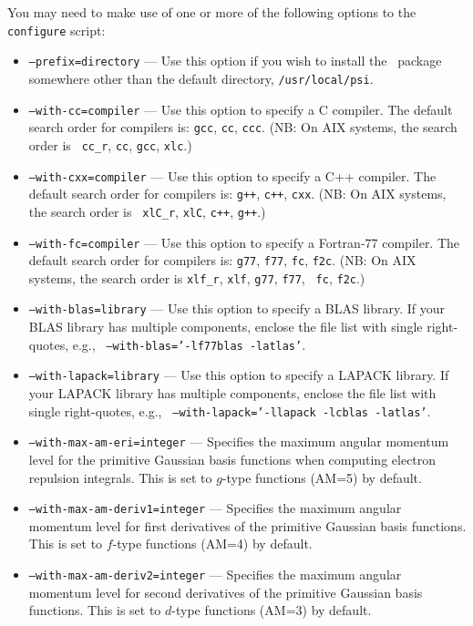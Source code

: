 \documentclass[12pt]{article}
\begin{document}
\noindent
You may need to make use of one or more of the following options to
the {\tt configure} script:
\begin{itemize}
\item {\tt --prefix=directory} --- Use this option if you wish to
  install the \PSIthree\ package somewhere other than the default
  directory, {\tt /usr/local/psi}.
\item {\tt --with-cc=compiler} --- Use this option to specify a C
  compiler.  The default search order for compilers is: {\tt gcc},
  {\tt cc}, {\tt ccc}.  (NB: On AIX systems, the search order is {\tt
  cc\_r}, {\tt cc}, {\tt gcc}, {\tt xlc}.)
\item {\tt --with-cxx=compiler} --- Use this option to specify a C++
  compiler.  The default search order for compilers is: {\tt g++},
  {\tt c++}, {\tt cxx}.  (NB: On AIX systems, the search order is {\tt
  xlC\_r}, {\tt xlC}, {\tt c++}, {\tt g++}.)
\item {\tt --with-fc=compiler} --- Use this option to specify a
  Fortran-77 compiler.  The default search order for compilers is:
  {\tt g77}, {\tt f77}, {\tt fc}, {\tt f2c}.  (NB: On AIX systems, the
  search order is {\tt xlf\_r}, {\tt xlf}, {\tt g77}, {\tt f77}, {\tt
  fc}, {\tt f2c}.)
\item {\tt --with-blas=library} --- Use this option to specify a BLAS
  library.  If your BLAS library has multiple components, enclose the
  file list with single right-quotes, e.g., {\tt
  --with-blas='-lf77blas -latlas'}.
\item {\tt --with-lapack=library} --- Use this option to specify a
  LAPACK library.  If your LAPACK library has multiple components,
  enclose the file list with single right-quotes, e.g., {\tt
  --with-lapack='-llapack -lcblas -latlas'}.
\item {\tt --with-max-am-eri=integer} --- Specifies the maximum
  angular momentum level for the primitive Gaussian basis functions
  when computing electron repulsion integrals.  This is set to
  $g$-type functions (AM=5) by default.
\item {\tt --with-max-am-deriv1=integer} --- Specifies the maximum
  angular momentum level for first derivatives of the primitive
  Gaussian basis functions.  This is set to $f$-type functions (AM=4)
  by default.
\item {\tt --with-max-am-deriv2=integer} --- Specifies the maximum
  angular momentum level for second derivatives of the primitive
  Gaussian basis functions.  This is set to $d$-type functions (AM=3)
  by default.

\end{itemize}
\end{document}
